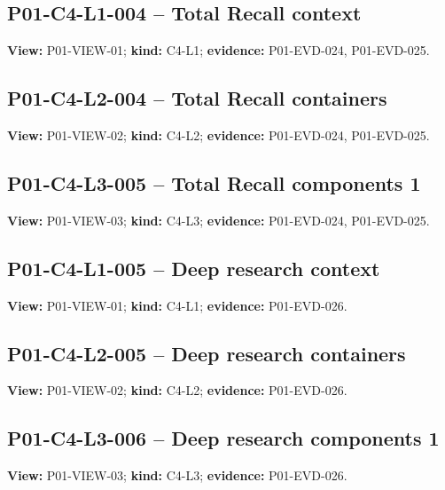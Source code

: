 \documentclass[10pt,letterpaper]{article}
\begin{document}
\subsection{P01-C4-L1-004 -- Total Recall context}
\textbf{View:} P01-VIEW-01; \textbf{kind:} C4-L1; \textbf{evidence:} P01-EVD-024, P01-EVD-025.\par
{}
\clearpage

\subsection{P01-C4-L2-004 -- Total Recall containers}
\textbf{View:} P01-VIEW-02; \textbf{kind:} C4-L2; \textbf{evidence:} P01-EVD-024, P01-EVD-025.\par
{}
\clearpage

\subsection{P01-C4-L3-005 -- Total Recall components 1}
\textbf{View:} P01-VIEW-03; \textbf{kind:} C4-L3; \textbf{evidence:} P01-EVD-024, P01-EVD-025.\par
{}
\clearpage

\subsection{P01-C4-L1-005 -- Deep research context}
\textbf{View:} P01-VIEW-01; \textbf{kind:} C4-L1; \textbf{evidence:} P01-EVD-026.\par
{}
\clearpage

\subsection{P01-C4-L2-005 -- Deep research containers}
\textbf{View:} P01-VIEW-02; \textbf{kind:} C4-L2; \textbf{evidence:} P01-EVD-026.\par
{}
\clearpage

\subsection{P01-C4-L3-006 -- Deep research components 1}
\textbf{View:} P01-VIEW-03; \textbf{kind:} C4-L3; \textbf{evidence:} P01-EVD-026.\par
{}
\clearpage
\end{document}
